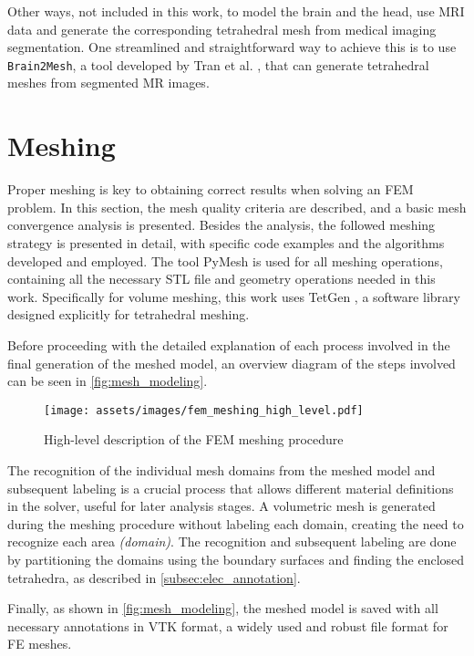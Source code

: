 Other ways, not included in this work, to model the brain and the head, use \gls{MRI} data and generate the corresponding tetrahedral mesh from medical imaging segmentation. One streamlined and straightforward way to achieve this is to use \texttt{Brain2Mesh}, a tool developed by Tran et al. \cite{Tran2020}, that can generate tetrahedral meshes from segmented \gls{MR} images.

\section{Meshing}
\label{sec:fem_meshing}

Proper meshing is key to obtaining correct results when solving an \gls{FEM} problem. In this section, the mesh quality criteria are described, and a basic mesh convergence analysis is presented. Besides the analysis, the followed meshing strategy is presented in detail, with specific code examples and the algorithms developed and employed. The tool PyMesh \cite{pymesh} is used for all meshing operations, containing all the necessary \gls{STL} file and geometry operations needed in this work. Specifically for volume meshing, this work uses TetGen \cite{tetgen}, a software library designed explicitly for tetrahedral meshing.

Before proceeding with the detailed explanation of each process involved in the final generation of the meshed model, an overview diagram of the steps involved can be seen in \autoref{fig:mesh_modeling}.

\begin{figure}[H]
    \centering
    \texttt{[image: assets/images/fem\_meshing\_high\_level.pdf]}
    \caption{High-level description of the \gls{FEM} meshing procedure}
    \label{fig:mesh_modeling}
\end{figure}

\noindent The recognition of the individual mesh domains from the meshed model and subsequent labeling is a crucial process that allows different material definitions in the solver, useful for later analysis stages. A volumetric mesh is generated during the meshing procedure without labeling each domain, creating the need to recognize each area \textit{(domain)}. The recognition and subsequent labeling are done by partitioning the domains using the boundary surfaces and finding the enclosed tetrahedra, as described in \ref{subsec:elec_annotation}.

Finally, as shown in \autoref{fig:mesh_modeling}, the meshed model is saved with all necessary annotations in \gls{VTK} format, a widely used and robust file format for \gls{FE} meshes.

